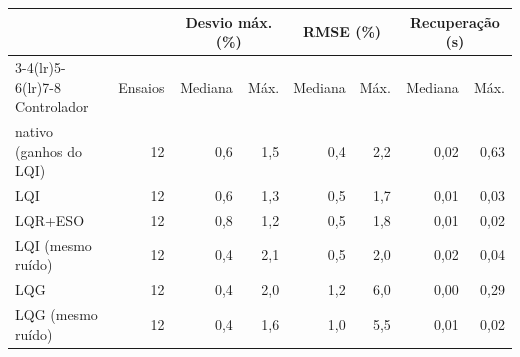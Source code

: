 \begin{tabular}{lrrrrrrr}
\toprule
 & & \multicolumn{2}{c}{Desvio máx. (\%)} & \multicolumn{2}{c}{RMSE (\%)} & \multicolumn{2}{c}{Recuperação (\si{\second})} \\
\cmidrule(lr){3-4}\cmidrule(lr){5-6}\cmidrule(lr){7-8}
Controlador & Ensaios & Mediana & Máx. & Mediana & Máx. & Mediana & Máx. \\
\midrule
nativo (ganhos do LQI) & 12 & 0,6 & 1,5 & 0,4 & 2,2 & 0,02 & 0,63 \\
LQI & 12 & 0,6 & 1,3 & 0,5 & 1,7 & 0,01 & 0,03 \\
LQR+ESO & 12 & 0,8 & 1,2 & 0,5 & 1,8 & 0,01 & 0,02 \\
LQI (mesmo ruído) & 12 & 0,4 & 2,1 & 0,5 & 2,0 & 0,02 & 0,04 \\
LQG & 12 & 0,4 & 2,0 & 1,2 & 6,0 & 0,00 & 0,29 \\
LQG (mesmo ruído) & 12 & 0,4 & 1,6 & 1,0 & 5,5 & 0,01 & 0,02 \\
\bottomrule
\end{tabular}
